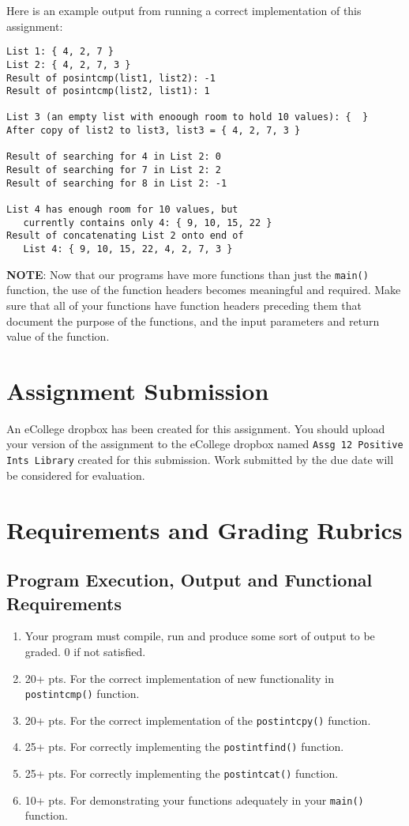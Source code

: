 \documentclass[11pt]{article}
\begin{document}
Here is an example output from running a correct implementation of
this assignment:


\begin{verbatim}
List 1: { 4, 2, 7 }
List 2: { 4, 2, 7, 3 }
Result of posintcmp(list1, list2): -1
Result of posintcmp(list2, list1): 1

List 3 (an empty list with enoough room to hold 10 values): {  }
After copy of list2 to list3, list3 = { 4, 2, 7, 3 }

Result of searching for 4 in List 2: 0
Result of searching for 7 in List 2: 2
Result of searching for 8 in List 2: -1

List 4 has enough room for 10 values, but 
   currently contains only 4: { 9, 10, 15, 22 }
Result of concatenating List 2 onto end of 
   List 4: { 9, 10, 15, 22, 4, 2, 7, 3 }
\end{verbatim}

\textbf{NOTE}: Now that our programs have more functions than just the
\verb~main()~ function, the use of the function headers becomes meaningful
and required.  Make sure that all of your functions have function
headers preceding them that document the purpose of the functions, and
the input parameters and return value of the function.
\section*{Assignment Submission}
\label{sec-4}


An eCollege dropbox has been created for this assignment.  You should
upload your version of the assignment to the eCollege dropbox named
\verb~Assg 12 Positive Ints Library~ created for this submission.  Work
submitted by the due date will be considered for evaluation.
\section*{Requirements and Grading Rubrics}
\label{sec-5}
\subsection*{Program Execution, Output and Functional Requirements}
\label{sec-5-1}


\begin{enumerate}
\item Your program must compile, run and produce some sort of output to
   be graded. 0 if not satisfied.
\item 20+ pts. For the correct implementation of new functionality in \verb~postintcmp()~
   function.
\item 20+ pts. For the correct implementation of the \verb~postintcpy()~ function.
\item 25+ pts. For correctly implementing the \verb~postintfind()~ function.
\item 25+ pts. For correctly implementing the \verb~postintcat()~ function.
\item 10+ pts. For demonstrating your functions adequately in your \verb~main()~ function.
\end{enumerate}
\end{document}
